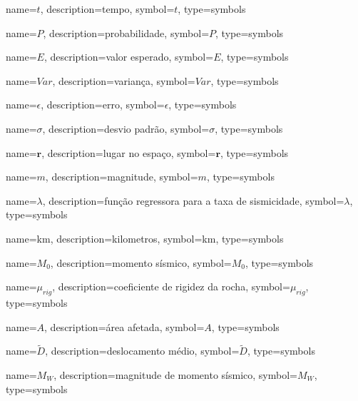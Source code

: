 
{
	name={\ensuremath{t}},
	description={tempo},
	symbol={\ensuremath{t}},
	type=symbols
}

{
	name={\ensuremath{P}},
	description={probabilidade},
	symbol={\ensuremath{P}},
	type=symbols
}

{
	name={\ensuremath{E}},
	description={valor esperado},
	symbol={\ensuremath{E}},
	type=symbols
}

{
	name={\ensuremath{Var}},
	description={variança},
	symbol={\ensuremath{Var}},
	type=symbols
}

{
	name={\ensuremath{\epsilon}},
	description={erro},
	symbol={\ensuremath{\epsilon}},
	type=symbols
}

{
	name={\ensuremath{\sigma}},
	description={desvio padrão},
	symbol={\ensuremath{\sigma}},
	type=symbols
}


{
	name={\ensuremath{\boldsymbol{r}}},
	description={lugar no espaço},
	symbol={\ensuremath{\boldsymbol{r}}},
	type=symbols
}


{
	name={\ensuremath{m}},
	description={magnitude},
	symbol={\ensuremath{m}},
	type=symbols
}


{
	name={\ensuremath{\lambda}},
	description={função regressora para a taxa de sismicidade},
	symbol={\ensuremath{\lambda}},
	type=symbols
}

{
	name={km},
	description={kilometros},
	symbol={km},
	type=symbols
}

{
	name={\ensuremath{M_0}},
	description={momento sísmico},
	symbol={\ensuremath{M_0}},
	type=symbols
}


{
	name={\ensuremath{\mu_{rig}}},
	description={coeficiente de rigidez da rocha},
	symbol={\ensuremath{\mu_{rig}}},
	type=symbols
}


{
	name={\ensuremath{A}},
	description={área afetada},
	symbol={\ensuremath{A}},
	type=symbols
}


{
	name={\ensuremath{\tilde{D}}},
	description={deslocamento médio},
	symbol={\ensuremath{\tilde{D}}},
	type=symbols
}


{
	name={\ensuremath{M_W}},
	description={magnitude de momento sísmico},
	symbol={\ensuremath{M_W}},
	type=symbols
}

